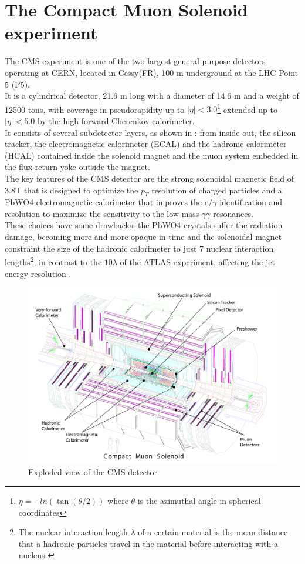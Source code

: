 \section{The Compact Muon Solenoid experiment}
The CMS experiment \cite{Chatrchyan2008TheLHC} is one of the two largest general purpose detectors operating at CERN, located in Cessy(FR), 100 m underground at the LHC Point 5 (P5).\\
It is a cylindrical detector, 21.6 m long with a diameter of 14.6 m and a weight of 12500 tons, with coverage in pseudorapidity up to $|\eta|<3.0$\footnote{$\eta=-ln(\tan (\theta/2))$ where $\theta$ is the azimuthal angle in spherical coordinates} extended up to $|\eta|<5.0$ by the high forward Cherenkov calorimeter.\\
It consists of several subdetector layers, as shown in : from inside out, the silicon tracker, the electromagnetic calorimeter (ECAL) and the hadronic calorimeter (HCAL) contained inside the solenoid magnet and the muon system embedded in the flux-return yoke outside the magnet.\\
The key features of the CMS detector are the strong solenoidal magnetic field of 3.8T that is designed to optimize the $p_T$ resolution of charged particles and a PbWO4 electromagnetic calorimeter that improves the $e/\gamma$ identification and resolution to maximize the sensitivity to the low mass $\gamma \gamma$ resonances.\\
These choices have some drawbacks: the PbWO4 crystals suffer the radiation damage, becoming more and more opaque in time and the solenoidal magnet constraint the size of the hadronic calorimeter to just 7 nuclear interaction lengths\footnote{The nuclear interaction length $\lambda$ of a certain material is the mean distance that a hadronic particles travel in the material before interacting with a nucleus \label{fn:ncl}}, in contrast to the $10\lambda$ of the ATLAS experiment, affecting the jet energy resolution \cite{Spiropulu2012LHCsDETECTORS}.
\begin{figure}[h!]
    \centering
    \includegraphics[width=1\linewidth]{fig//chap03-cms/CMS_detector_white.pdf}
    \caption{Exploded view of the CMS detector \cite{Chatrchyan2008TheLHC}}
    \label{fig:cms_exploded}
\end{figure}

